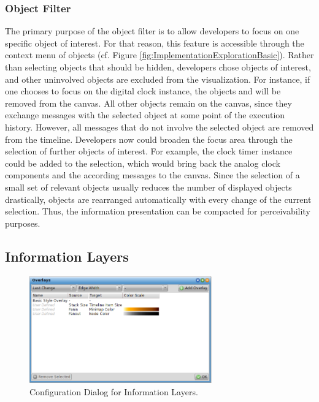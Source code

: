 \subsubsection{Object Filter}
The primary purpose of the object filter is to allow developers to focus on one specific object of interest.
For that reason, this feature is accessible through the context menu of objects (cf. Figure \ref{fig:ImplementationExplorationBasic}).
Rather than selecting objects that should be hidden, developers chose objects of interest, and other uninvolved objects are excluded from the visualization.
For instance, if one chooses to focus on the digital clock instance, the objects  and  will be removed from the canvas.
All other objects remain on the canvas, since they exchange messages with the selected object at some point of the execution history.
However, all messages that do not involve the selected object are removed from the timeline.
Developers now could broaden the focus area through the selection of further objects of interest.
For example, the clock timer instance could be added to the selection, which would bring back the analog clock components and the according messages to the canvas.
Since the selection of a small set of relevant objects usually reduces the number of displayed objects drastically, objects are rearranged automatically with every change of the current selection.
Thus, the information presentation can be compacted for perceivability purposes.

\subsection{Information Layers}
\label{ss:ImplementationLayers}

\begin{figure}[tb]
	\centering
	\includegraphics[width=0.7\textwidth]{../images/04-ImplOverlays}
	\caption{Configuration Dialog for Information Layers.}
	\label{fig:ImplementationLayers}
\end{figure}

